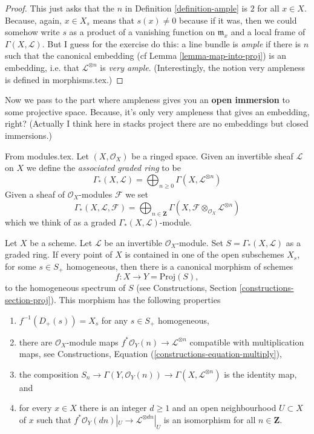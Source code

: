 \begin{proof}
This just asks that the $n$ in Definition \ref{definition-ample} is $2$ for all
$x\in X$. Because, again, $x\in X_s$ means that $s(x)\neq 0$ because if it was,
then we could somehow write $s$ as a product of a vanishing function on
$\mathfrak{m}_x$ and a local frame of $\Gamma(X,\mathcal{L})$. But I guess for
the exercise do this: a line bundle is {\it ample} if there is $n$ such that the
canonical embedding (cf Lemma \ref{lemma-map-into-proj}) is an embedding, i.e.
that $\mathcal{L}^{\otimes n}$ is {\it very ample}. (Interestingly, the notion
very ampleness is defined in morphisms.tex.)
\end{proof}

Now we pass to the part where ampleness gives you an {\bf open immersion} to
some projective space. Because, it's only very ampleness that gives an
embedding, right? (Actually I think here in stacks project there are no
embeddings but closed immersions.)

\begin{definition}
\label{definition-gamma-star}
From modules.tex. Let $(X, \mathcal{O}_X)$ be a ringed space.
Given an invertible sheaf $\mathcal{L}$ on $X$ we define
the {\it associated graded ring} to be
$$
\Gamma_*(X, \mathcal{L})
=
\bigoplus\nolimits_{n \geq 0} \Gamma(X, \mathcal{L}^{\otimes n})
$$
Given a sheaf of $\mathcal{O}_X$-modules $\mathcal{F}$ we set
$$
\Gamma_*(X, \mathcal{L}, \mathcal{F})
=
\bigoplus\nolimits_{n \in \mathbf{Z}} \Gamma(X,
\mathcal{F} \otimes_{\mathcal{O}_X} \mathcal{L}^{\otimes n})
$$
which we think of as a graded $\Gamma_*(X, \mathcal{L})$-module.
\end{definition}

\begin{lemma}
\label{lemma-map-into-proj}
Let $X$ be a scheme.
Let $\mathcal{L}$ be an invertible $\mathcal{O}_X$-module.
Set $S = \Gamma_*(X, \mathcal{L})$ as a graded ring.
If every point of $X$ is contained in one of the
open subschemes $X_s$, for some $s \in S_{+}$ homogeneous, then
there is a canonical morphism of schemes
$$
f : X \longrightarrow Y = \text{Proj}(S),
$$
to the homogeneous spectrum of $S$ (see
Constructions, Section \ref{constructions-section-proj}).
This morphism has the following properties
\begin{enumerate}
\item $f^{-1}(D_{+}(s)) = X_s$ for any $s \in S_{+}$ homogeneous,
\item there are $\mathcal{O}_X$-module maps
$f^*\mathcal{O}_Y(n) \to \mathcal{L}^{\otimes n}$
compatible with multiplication maps, see
Constructions, Equation (\ref{constructions-equation-multiply}),
\item the composition
$S_n \to \Gamma(Y, \mathcal{O}_Y(n)) \to \Gamma(X, \mathcal{L}^{\otimes n})$
is the identity map, and
\item for every $x \in X$ there is an integer $d \geq 1$
and an open neighbourhood $U \subset X$ of $x$
such that $f^*\mathcal{O}_Y(dn)|_U \to \mathcal{L}^{\otimes dn}|_U$
is an isomorphism for all $n \in \mathbf{Z}$.
\end{enumerate}
\end{lemma}

